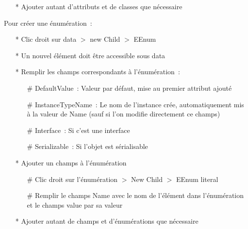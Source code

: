 \documentclass{article}
\begin{document}
\begin{itemize}
\begin{itemize}
\begin{itemize}
    \item Volatile~: Si l'attibut est volatile
    \end{itemize}
  \item[\#] Ajout de la description de l'attribut
    \begin{itemize}
    \item Clic droit sur l'attribut $>$ New Child $>$ EAnnotation
    \item Remplir le champs source avec la cha\^ine de caract\`ere \textit{Description}
    \item Clic droit sur l'\'el\'ement EAnnotation $>$ New Child $>$ Details entry
    \item Remplir le champs key avec la cha\^ine de caract\`ere \textit{content} et le champs value avec la description de l'attribut
    \item Si l'attribut est une option d'un type non basique, ajouter un autre \textit{Details entry} avec comme champs \textit{shortOption} dans key et dans value l'option (par exemple \textbf{p} si l'option est \textit{-p})
    \end{itemize}
  \end{itemize}
\item[*] Ajouter autant d'attributs et de classes que n\'ecessaire
\end{itemize}


Pour cr\'eer une \'enum\'eration~:
\begin{itemize}
\item[*] Clic droit sur data $>$ new Child $>$ EEnum
\item[*] Un nouvel \'el\'ement doit \^etre accessible sous data
\item[*] Remplir les champs correspondants \`a l'\'enum\'eration~:
  \begin{itemize}
  \item[\#] DefaultValue~: Valeur par d\'efaut, mise au premier attribut ajout\'e
  \item[\#] InstanceTypeName~: Le nom de l'instance cr\'ee, automatiquement mis \`a la valeur de Name (sauf si l'on modifie directement ce champs)
  \item[\#] Interface~: Si c'est une interface
  \item[\#] Serializable~: Si l'objet est s\'erialisable
  \end{itemize}
\item[*] Ajouter un champs \`a l'\'enum\'eration
  \begin{itemize}
  \item[\#] Clic droit sur l'\'enum\'eration $>$ New Child $>$ EEnum literal
  \item[\#] Remplir le champs Name avec le nom de l'\'el\'ement dans l'\'enum\'eration et le champs value par sa valeur
  \end{itemize}
\item[*] Ajouter autant de champs et d'\'enum\'erations que n\'ecessaire
\end{itemize}
\end{document}
